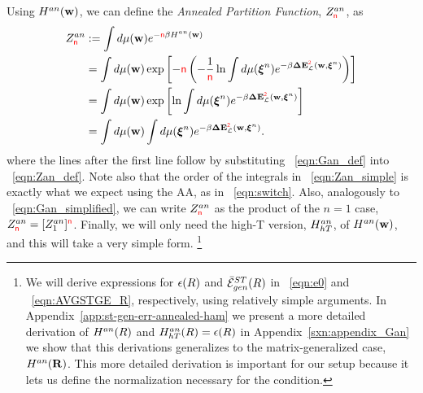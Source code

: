 Using $H^{an}({\mathbf{w}})$, we can define the \emph{Annealed Partition Function}, $Z^{an}_{{\color{red}\sf{n}}}$, as
\begin{align}
  \label{eqn:Zan_def}
  Z^{an}_{{\color{red}\sf{n}}} 
  &:=  \int d\mu({\mathbf{w}}) e^{-{\color{red}\sf{n}}\beta H^{an}({\mathbf{w}})} \\ \nonumber
  &=\int d\mu({\mathbf{w}}) \exp\left[-{\color{red}\sf{n}} \left(- \frac{1}{{\color{red}\sf{n}}}\ln  \int d\mu(\boldsymbol{\xi}^{n})e^{-\beta\mathbf{\Delta {E}}^{{\color{red}\sf{2}}}_{\mathcal{L}}(\mathbf{w}, \boldsymbol{\xi}^{n})}\right)\right] \\ \nonumber
  &=  \int d\mu({\mathbf{w}}) \exp\left[\ln  \int d\mu(\boldsymbol{\xi}^{n})e^{-\beta\mathbf{\Delta {E}}^{{\color{red}\sf{2}}}_{\mathcal{L}}(\mathbf{w}, \boldsymbol{\xi}^{n})}\right] \\ 
  \label{eqn:Zan_simple}
  &=  \int d\mu({\mathbf{w}})  \int d\mu(\boldsymbol{\xi}^{n})e^{-\beta\mathbf{\Delta {E}}^{{\color{red}\sf{2}}}_{\mathcal{L}}(\mathbf{w}, \boldsymbol{\xi}^{n})} .
\end{align}
where the lines after the first line follow by substituting \EQN~\ref{eqn:Gan_def} into \EQN~\ref{eqn:Zan_def}.
Note also that the order of the integrals in \EQN~\ref{eqn:Zan_simple} is exactly what we expect using the AA, as in \EQN~\ref{eqn:switch}.
Also, analogously to \EQN~\ref{eqn:Gan_simplified}, we can write $Z^{an}_{{\color{red}\sf{n}}}$ as the product of the $n=1$ case, $Z^{an}_{{\color{red}\sf{n}}}=[Z^{an}_{1}]^{{\color{red}\sf{n}}}$.
Finally, we will only need the high-T version, $H^{an}_{hT}$, of $H^{an}({\mathbf{w}})$, and this will take a very simple form.
\footnote{We will derive expressions for $\epsilon(R)$ and $\bar{\mathcal{E}}^{ST}_{gen}(R)$ in \EQN~\ref{eqn:e0} and \EQN~\ref{eqn:AVGSTGE_R}, respectively, using relatively simple arguments.
In Appendix~\ref{app:st-gen-err-annealed-ham} we present
a more detailed derivation of $H^{an}(R)$ and $H^{an}_{hT}(R)=\epsilon(R)$
in Appendix~\ref{sxn:appendix_Gan} we show that this derivations generalizes to the matrix-generalized case, $H^{an}(\mathbf{R})$.
This more detailed derivation is important for our \SETOL setup because it lets us define the normalization
necessary for the \TRACELOG condition.
}



